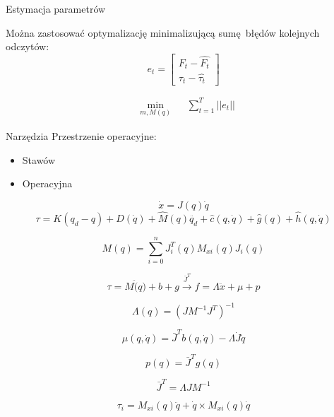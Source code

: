 \documentclass{beamer}
\begin{document}
\begin{frame}{Estymacja parametrów}

	Można zastosować optymalizację minimalizującą sumę błędów kolejnych odczytów:
	\begin{equation}
	e_t = \begin{bmatrix}
	F_t - \hat{F_t}\\
	\tau_t - \hat{\tau_t}
	\end{bmatrix}
	\end{equation}

	\begin{equation}
	\begin{aligned}
	& \underset{m, M(q)}{\text{min}}
	& & \sum_{t = 1}^{T} || e_t ||
	\end{aligned}
	\end{equation}

\end{frame}

\begin{frame}[allowframebreaks]{Narzędzia}
	Przestrzenie operacyjne:
	\begin{itemize}
		\item Stawów
		\item Operacyjna
	\end{itemize}

	\begin{equation}
		\dot{x} = J(q)\dot{q}
	\end{equation}
\framebreak
	\begin{equation}
	\tau = K(q_d-q) + D(\dot{q}) + \hat{M}(q)\ddot{q_d} + \hat{c}(q, \dot{q}) + \hat{g}(q) + \hat{h}(q, \dot{q})
	\end{equation}


	\begin{equation}
	M(q) = \sum_{i=0}^{n}J_i^T(q)M_{xi}(q)J_i(q)
	\end{equation}

	\framebreak
	\begin{equation}
	\tau = M\ddot(q) + b + g \xrightarrow{\bar{J}^T} f = \Lambda\ddot{x} + \mu + p
	\end{equation}

	\begin{equation}
	\Lambda(q) = (JM^{-1}J^T)^{-1}
	\end{equation}

	\begin{equation}
	\mu(q, \dot{q}) = \bar{J}^Tb(q, \dot{q})-\Lambda\dot{J}\dot{q}
	\end{equation}

	\begin{equation}
	p(q) = \bar{J}^Tg(q)
	\end{equation}

	\begin{equation}
	 \bar{J}^T=\Lambda JM^{-1}
	\end{equation}

	\begin{equation}
	\tau_i = M_{xi}(q)\ddot{q} + \dot{q} \times M_{xi}(q)\dot{q}
	\end{equation}
\end{frame}
\end{document}

